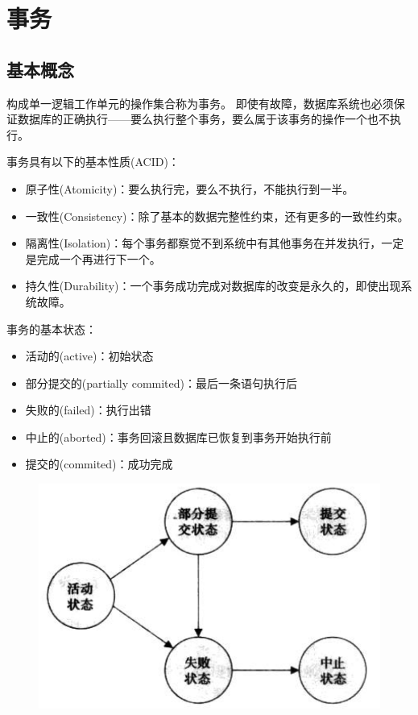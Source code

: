 
\section{事务} %
\subsection{基本概念}
\begin{definition}[事务(transaction)]
构成单一逻辑工作单元的操作集合称为事务。
即使有故障，数据库系统也必须保证数据库的正确执行——要么执行整个事务，要么属于该事务的操作一个也不执行。
\end{definition}

事务具有以下的基本性质(ACID)：
\begin{itemize}
	\item 原子性(Atomicity)：要么执行完，要么不执行，不能执行到一半。
	\item 一致性(Consistency)：除了基本的数据完整性约束，还有更多的一致性约束。
	\item 隔离性(Isolation)：每个事务都察觉不到系统中有其他事务在并发执行，一定是完成一个再进行下一个。
	\item 持久性(Durability)：一个事务成功完成对数据库的改变是永久的，即使出现系统故障。
\end{itemize}

事务的基本状态：
\begin{itemize}
	\item 活动的(active)：初始状态
	\item 部分提交的(partially commited)：最后一条语句执行后
	\item 失败的(failed)：执行出错
	\item 中止的(aborted)：事务回滚且数据库已恢复到事务开始执行前
	\item 提交的(commited)：成功完成
\end{itemize}
\begin{figure}[H]
\centering
\includegraphics[width=0.5\linewidth]{fig/transaction_state.png}
\end{figure}

